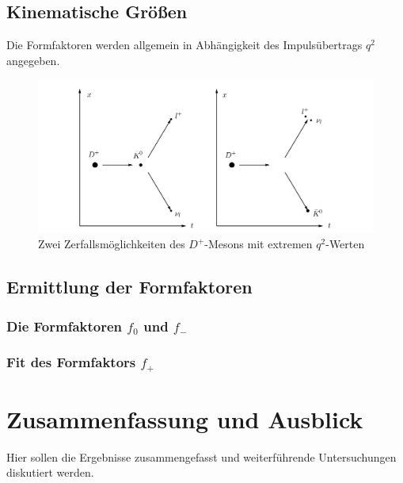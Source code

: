 \documentclass[11pt,a4paper,twoside]{report}
\begin{document}
\section{Kinematische Größen}
Die Formfaktoren werden allgemein in Abhängigkeit des Impulsübertrags $q^2$ angegeben. 
\begin{figure}[H]
\includegraphics[width=1\textwidth]{Abbildungen/DZerfall.png}
\caption{Zwei Zerfallsmöglichkeiten des $D^+$-Mesons  mit extremen $q^2$-Werten}
\label{pic_DZerfall}
\end{figure}


\section{Ermittlung der Formfaktoren}
\subsection{Die Formfaktoren $f_0$ und $f_-$}
\subsection{Fit des Formfaktors $f_+$}


\chapter{Zusammenfassung und Ausblick}

Hier sollen die Ergebnisse zusammengefasst und weiterf\"uhrende Untersuchungen diskutiert werden. 



\begin{appendix}
%
\end{appendix}

\end{document}
